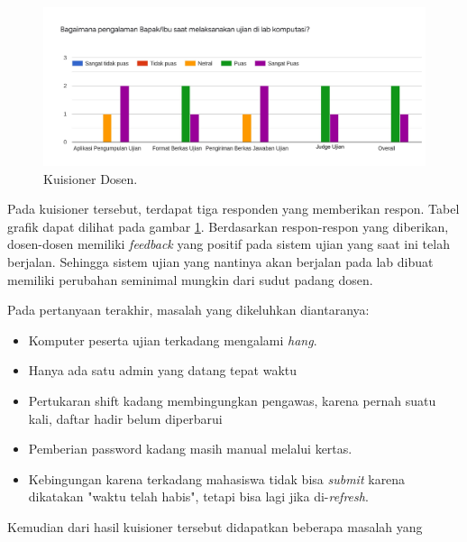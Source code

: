     \begin{figure}
        \centering
        \includegraphics[width=0.6\paperwidth]{Gambar/survey-dosen.pdf}
        \caption{Kuisioner Dosen.}
        \label{fig:kuisioner-dosen}
    \end{figure}

    Pada kuisioner tersebut, terdapat tiga responden yang memberikan respon.
    Tabel grafik dapat dilihat pada gambar \ref{fig:kuisioner-dosen}.
    Berdasarkan respon-respon yang diberikan, dosen-dosen memiliki
    \textit{feedback} yang positif pada sistem ujian yang saat ini telah
    berjalan. Sehingga sistem ujian yang nantinya akan berjalan pada lab dibuat
    memiliki perubahan seminimal mungkin dari sudut padang dosen.

    Pada pertanyaan terakhir, masalah yang dikeluhkan diantaranya:
    \begin{itemize}
        \item Komputer peserta ujian terkadang mengalami \textit{hang}.
        
        \item Hanya ada satu admin yang datang tepat waktu
        
        \item Pertukaran shift kadang membingungkan pengawas, karena pernah
        suatu kali, daftar hadir belum diperbarui
        
        \item Pemberian password kadang masih manual melalui kertas.
        
        \item Kebingungan karena terkadang mahasiswa tidak bisa \textit{submit}
        karena dikatakan "waktu telah habis", tetapi bisa lagi jika
        di-\textit{refresh}.
    \end{itemize}

    Kemudian dari hasil kuisioner tersebut didapatkan beberapa masalah yang
